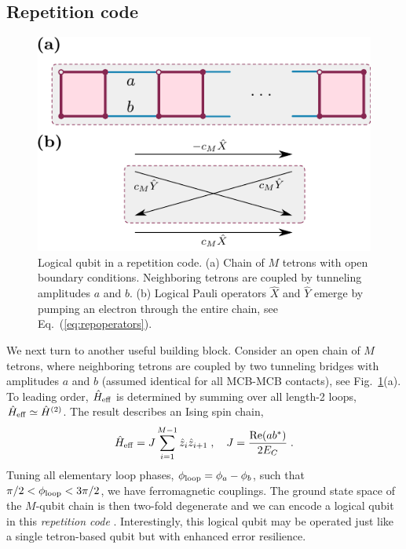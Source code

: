 \documentclass[twocolumn,floats,prx,showpacs]{revtex4-1}
\begin{document}
\subsection{Repetition code}\label{sec3c}

\begin{figure}
\includegraphics[width=0.9\columnwidth]{fig/repetition.pdf}
\caption{Logical qubit in a repetition code. (a) Chain of $M$ tetrons with open boundary conditions. Neighboring tetrons are coupled by tunneling amplitudes $a$ and $b$. (b) Logical Pauli operators $\hat X$ and $\hat Y$ emerge by pumping an electron through the entire chain, see Eq.~(\ref{eq:repoperators}).}
\label{fig:rep}
\end{figure}

We next turn to another useful building block.  Consider an open chain of $M$ tetrons, where neighboring tetrons are coupled by two tunneling bridges with amplitudes $a$ and $b$ (assumed identical for all MCB-MCB contacts), 
see Fig.~\ref{fig:rep}(a). 
To leading order, $\hat H_{\rm eff}$ is determined by summing over all length-2 loops,
$\hat H_{\rm eff}\simeq \hat H^{(2)}$. The result describes an Ising spin chain, 
\begin{equation}
\hat H_{\rm eff}= J \sum_{i=1}^{M-1}  \hat z_i \hat z_{i+1} \;,\quad J=\frac{\textrm{Re}(a b^*)}{2 E_C}\;.\label{eq:repHe}
\end{equation}
 Tuning all elementary loop phases, $\phi_{\rm loop}=\phi_a-\phi_b$, such that 
$\pi/2<\phi_{\rm loop}<3\pi/2$, we have ferromagnetic couplings.  
The ground state space of the $M$-qubit chain is then two-fold degenerate and 
we can encode a logical qubit in this \emph{repetition code} \cite{RevModPhys.87.307}. 
Interestingly, this logical qubit may be operated just like a single tetron-based qubit but with enhanced error resilience. 
\end{document}
